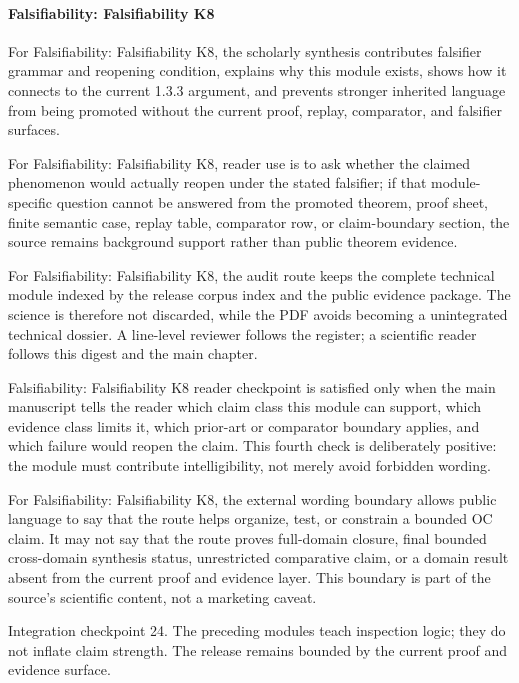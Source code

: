 \paragraph{Falsifiability: Falsifiability K8}

For Falsifiability: Falsifiability K8, the scholarly synthesis contributes falsifier grammar and reopening condition, explains why this module exists, shows how it connects to the current 1.3.3 argument, and prevents stronger inherited language from being promoted without the current proof, replay, comparator, and falsifier surfaces.


For Falsifiability: Falsifiability K8, reader use is to ask whether the claimed phenomenon would actually reopen under the stated falsifier; if that module-specific question cannot be answered from the promoted theorem, proof sheet, finite semantic case, replay table, comparator row, or claim-boundary section, the source remains background support rather than public theorem evidence.


For Falsifiability: Falsifiability K8, the audit route keeps the complete technical module indexed by the release corpus index and the public evidence package. The science is therefore not discarded, while the PDF avoids becoming a unintegrated technical dossier. A line-level reviewer follows the register; a scientific reader follows this digest and the main chapter.


Falsifiability: Falsifiability K8 reader checkpoint is satisfied only when the main manuscript tells the reader which claim class this module can support, which evidence class limits it, which prior-art or comparator boundary applies, and which failure would reopen the claim. This fourth check is deliberately positive: the module must contribute intelligibility, not merely avoid forbidden wording.


For Falsifiability: Falsifiability K8, the external wording boundary allows public language to say that the route helps organize, test, or constrain a bounded OC claim. It may not say that the route proves full-domain closure, final bounded cross-domain synthesis status, unrestricted comparative claim, or a domain result absent from the current proof and evidence layer. This boundary is part of the source's scientific content, not a marketing caveat.


Integration checkpoint 24. The preceding modules teach inspection logic; they do not inflate claim strength. The release remains bounded by the current proof and evidence surface.


